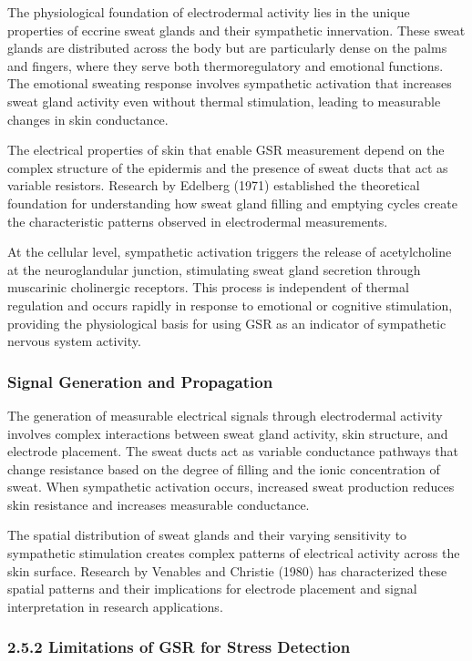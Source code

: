 \documentclass[11pt,a4paper]{article}
\begin{document}
The physiological foundation of electrodermal activity lies in the unique properties of eccrine sweat glands and their
sympathetic innervation. These sweat glands are distributed across the body but are particularly dense on the palms and
fingers, where they serve both thermoregulatory and emotional functions. The emotional sweating response involves
sympathetic activation that increases sweat gland activity even without thermal stimulation, leading to measurable
changes in skin conductance.

The electrical properties of skin that enable GSR measurement depend on the complex structure of the epidermis and the
presence of sweat ducts that act as variable resistors. Research by Edelberg (1971) established the theoretical
foundation for understanding how sweat gland filling and emptying cycles create the characteristic patterns observed in
electrodermal measurements.

At the cellular level, sympathetic activation triggers the release of acetylcholine at the neuroglandular junction,
stimulating sweat gland secretion through muscarinic cholinergic receptors. This process is independent of thermal
regulation and occurs rapidly in response to emotional or cognitive stimulation, providing the physiological basis for
using GSR as an indicator of sympathetic nervous system activity.

\subsubsection{Signal Generation and Propagation}

The generation of measurable electrical signals through electrodermal activity involves complex interactions between
sweat gland activity, skin structure, and electrode placement. The sweat ducts act as variable conductance pathways that
change resistance based on the degree of filling and the ionic concentration of sweat. When sympathetic activation
occurs, increased sweat production reduces skin resistance and increases measurable conductance.

The spatial distribution of sweat glands and their varying sensitivity to sympathetic stimulation creates complex
patterns of electrical activity across the skin surface. Research by Venables and Christie (1980) has characterized
these spatial patterns and their implications for electrode placement and signal interpretation in research
applications.

\subsubsection{2.5.2 Limitations of GSR for Stress Detection}
\end{document}
